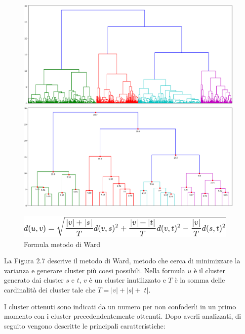 \begin{figure}[!htb]
  \includegraphics[width=\linewidth]{img/euclidean-ward.png}
  \caption{}\label{euward}
\endminipage\hfill
{}
  \includegraphics[width=\linewidth]{img/euclidean-ward-truncate.png}
  \caption{}\label{euwardtrunc}
\endminipage\hfill
\end{figure}

\begin{figure}[H]
\includegraphics[width=0.5\linewidth]{img/ward_linkage.png}
\centering
\caption{Formula metodo di Ward}
\label{dendro-complete}
\end{figure} 

La Figura 2.7 descrive il metodo di Ward, metodo che cerca di minimizzare la varianza e generare cluster più coesi possibili. Nella formula $u$ è il cluster generato dai cluster $s$ e $t$, $v$ è un cluster inutilizzato e $T$ è la somma delle cardinalità dei cluster tale che $T = |v| + |s| + |t|$.

\newpage
I cluster ottenuti sono indicati da un numero per non confoderli in un primo momento con i cluster precedendentemente ottenuti. Dopo averli analizzati, di seguito vengono descritte le principali caratteristiche:
